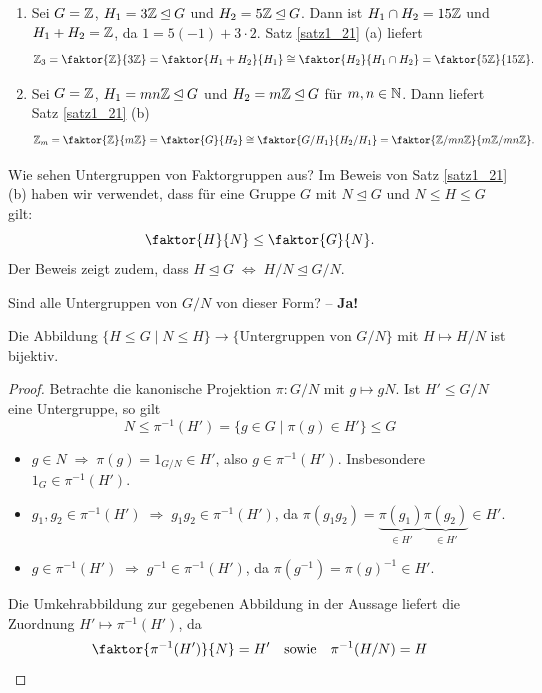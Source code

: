 \begin{beispiel}
	\begin{enumerate}[label=(\arabic*)]
		\item Sei $G = \mathbb{Z}$, $H_1 = 3\mathbb{Z} \unlhd G$ und $H_2 = 5\mathbb{Z} \unlhd G$. Dann ist $H_1 \cap H_2 = 15\mathbb{Z}$ und $H_1 + H_2 = \mathbb{Z}$, da $1 = 5(-1) + 3 \cdot 2.$ Satz \ref{satz1_21} (a) liefert
		\[\Z_3 = \faktor{\Z}{3\Z} = \faktor{H_1 + H_2}{H_1} \cong \faktor{H_2}{H_1 \cap H_2} = \faktor{5\Z}{15\Z}.\]
		\item Sei $G = \mathbb{Z}$, $H_1 = mn\mathbb{Z} \unlhd G$ und $H_2 = m\mathbb{Z} \unlhd G$ für $m,n \in \mathbb{N}$. Dann liefert Satz \ref{satz1_21} (b)
		\[\Z_m = \faktor{\Z}{m\Z} = \faktor{G}{H_2} \cong \faktor{G/H_1}{H_2/H_1} = \faktor{\Z/mn\Z}{m\Z/mn\Z}.\]
 	\end{enumerate}
\end{beispiel}

Wie sehen Untergruppen von Faktorgruppen aus? Im Beweis von Satz \ref{satz1_21} (b) haben wir verwendet, dass für eine Gruppe $G$ mit $N \unlhd G$ und $N \leq H \leq G$ gilt:
\[\faktor{H}{N} \leq \faktor{G}{N}.\]
Der Beweis zeigt zudem, dass $H \unlhd G \;\Leftrightarrow\; H/N \unlhd G/N$. 

\begin{leftbar}
	{Sind alle Untergruppen von $G/N$ von dieser Form?} -- \textbf{Ja!}
\end{leftbar}

\begin{satz}\label{satz1_23}
	Die Abbildung $\{H \leq G \mid N \leq H\} \to \{\text{Untergruppen von } G/N\}$ mit $H \mapsto H/N$ ist bijektiv.
\end{satz}
\begin{proof}
	Betrachte die kanonische Projektion $\pi \colon G/N$ mit $g \mapsto gN$. Ist $H' \leq G/N$ eine Untergruppe, so gilt 
	\[N \leq \pi^{-1}(H') = \{g \in G \mid \pi(g) \in H'\} \leq G\]
	\begin{itemize}
		\item $g \in N \;\Rightarrow\; \pi(g) = 1_{G/N} \in H'$, also $g \in \pi^{-1}(H')$. Insbesondere $1_G \in \pi^{-1}(H')$.
		\item $g_1, g_2 \in \pi^{-1}(H') \;\Rightarrow\; g_1g_2 \in \pi^{-1}(H')$, da $\pi(g_1g_2) = \underbrace{\pi(g_1)}_{\in H'}\underbrace{\pi(g_2)}_{\in H'} \in H'$.
		\item $g \in \pi^{-1}(H') \;\Rightarrow\; g^{-1} \in \pi^{-1}(H')$, da $\pi(g^{-1}) = \pi(g)^{-1} \in H'$.
	\end{itemize}
	Die Umkehrabbildung zur gegebenen Abbildung in der Aussage liefert die Zuordnung $H' \mapsto \pi^{-1}(H')$, da 
	\[\faktor{\pi^{-1}(H')}{N} = H' \quad\text{sowie}\quad \pi^{-1}(H/N) = H\]
\end{proof}

